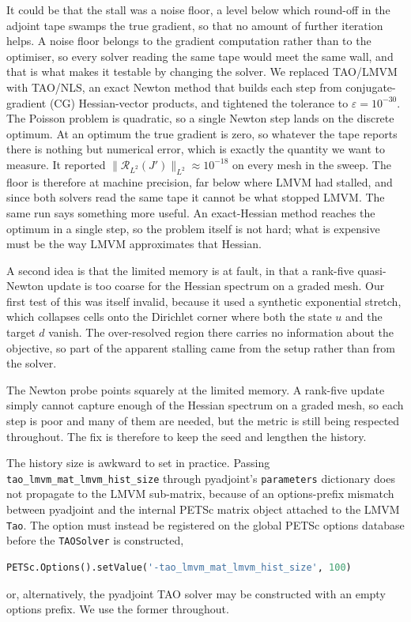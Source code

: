 \documentclass[a4paper,11pt]{article}
\newcommand{\Rmap}{\mathcal{R}}              %
\theoremstyle{spacedplain} \newtheorem{theorem}[counter]{Theorem} \newtheorem{lemma}[counter]{Lemma} \newtheorem{prop}[counter]{Proposition} \newtheorem{cor}[counter]{Corollary}
\theoremstyle{spaceddefinition} \newtheorem{defn}[counter]{Definition} \newtheorem{example}[counter]{Example} \newtheorem{remark}[counter]{Remark}
\begin{document}
It could be that the stall was a noise floor, a level below which round-off in the adjoint tape swamps the true gradient, so that no amount of further iteration helps. A noise floor belongs to the gradient computation rather than to the optimiser, so every solver reading the same tape would meet the same wall, and that is what makes it testable by changing the solver. We replaced TAO/LMVM with TAO/NLS, an exact Newton method that builds each step from conjugate-gradient (CG) Hessian-vector products, and tightened the tolerance to $\varepsilon = 10^{-30}$. The Poisson problem is quadratic, so a single Newton step lands on the discrete optimum. At an optimum the true gradient is zero, so whatever the tape reports there is nothing but numerical error, which is exactly the quantity we want to measure. It reported $\|\Rmap_{L^{2}}(J')\|_{L^{2}} \approx 10^{-18}$ on every mesh in the sweep. The floor is therefore at machine precision, far below where LMVM had stalled, and since both solvers read the same tape it cannot be what stopped LMVM. The same run says something more useful. An exact-Hessian method reaches the optimum in a single step, so the problem itself is not hard; what is expensive must be the way LMVM approximates that Hessian.

A second idea is that the limited memory is at fault, in that a rank-five quasi-Newton update is too coarse for the Hessian spectrum on a graded mesh. Our first test of this was itself invalid, because it used a synthetic exponential stretch, which collapses cells onto the Dirichlet corner where both the state $u$ and the target $d$ vanish. The over-resolved region there carries no information about the objective, so part of the apparent stalling came from the setup rather than from the solver.

The Newton probe points squarely at the limited memory. A rank-five update simply cannot capture enough of the Hessian spectrum on a graded mesh, so each step is poor and many of them are needed, but the metric is still being respected throughout. The fix is therefore to keep the seed and lengthen the history.

The history size is awkward to set in practice. Passing \texttt{tao\_lmvm\_mat\_lmvm\_hist\_size} through pyadjoint's \texttt{parameters} dictionary does not propagate to the LMVM sub-matrix, because of an options-prefix mismatch between pyadjoint and the internal PETSc matrix object attached to the LMVM \texttt{Tao}. The option must instead be registered on the global PETSc options database before the \texttt{TAOSolver} is constructed,
\begin{lstlisting}[language=Python]
PETSc.Options().setValue('-tao_lmvm_mat_lmvm_hist_size', 100)
\end{lstlisting}
or, alternatively, the pyadjoint TAO solver may be constructed with an empty options prefix. We use the former throughout.
\end{document}
